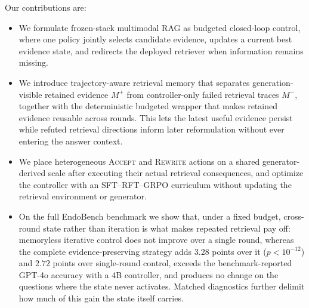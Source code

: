 Our contributions are:
\begin{itemize}
  \item We formulate frozen-stack multimodal RAG as budgeted closed-loop
  control, where one policy jointly selects candidate evidence, updates a
  current best evidence state, and redirects the deployed retriever when
  information remains missing.
  \item We introduce trajectory-aware retrieval memory that separates
  generation-visible retained evidence $M^+$ from controller-only failed
  retrieval traces $M^-$, together with the deterministic budgeted wrapper that
  makes retained evidence reusable across rounds. This lets the latest useful
  evidence persist while refuted retrieval directions inform later
  reformulation without ever entering the answer context.
  \item We place heterogeneous \textsc{Accept} and \textsc{Rewrite} actions on
  a shared generator-derived scale after executing their actual retrieval
  consequences, and optimize the controller with an SFT--RFT--GRPO curriculum
  without updating the retrieval environment or generator.
  \item On the full EndoBench benchmark we show that, under a fixed budget,
  cross-round state rather than iteration is what makes repeated retrieval pay
  off: memoryless iterative control does not improve over a single round,
  whereas the complete evidence-preserving strategy adds $3.28$ points over it
  ($p<10^{-12}$) and $2.72$ points over single-round control, exceeds the
  benchmark-reported GPT-4o accuracy with a 4B controller, and produces no
  change on the questions where the state never activates. Matched diagnostics
  further delimit how much of this gain the state itself carries.
\end{itemize}
